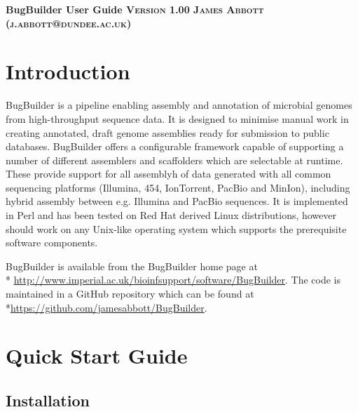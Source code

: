 \documentclass[a4paper,10pt]{article}
\begin{document}
\begin{titlepage}
\begin{center}
  \bfseries
  \huge BugBuilder User Guide
  \vskip 0.1in
  \textsc{\normalsize Version 1.00 }
  \vskip 0.1in
  \textsc{\normalsize James Abbott (j.abbott@dundee.ac.uk)}
\end{center}

\tableofcontents
\renewcommand{\baselinestretch}{1.0}\normalsize
\end{titlepage}
\newpage
\graphicspath{ {images/} }

\section{Introduction}

BugBuilder is a pipeline enabling assembly and annotation of microbial genomes
from high-throughput sequence data. It is designed to minimise manual work in
creating annotated, draft genome assemblies ready for submission to public
databases.  BugBuilder offers a configurable framework capable of supporting a
number of different assemblers and scaffolders which are selectable at runtime.
These provide support for all assemblyh of data generated with all common
sequencing platforms (Illumina, 454, IonTorrent, PacBio and MinIon), including
hybrid assembly between e.g. Illumina and PacBio sequences.  It is implemented
in Perl and has been tested on Red Hat derived Linux distributions, however
should work on any Unix-like operating system which supports the prerequisite
software components.


BugBuilder is available from the BugBuilder home page at\\*
\url{http://www.imperial.ac.uk/bioinfsupport/software/BugBuilder}. The code is
maintained in a GitHub repository which can be found at
\\*\url{https://github.com/jamesabbott/BugBuilder}.  

\section{Quick Start Guide}

\subsection{Installation}
\end{document}
